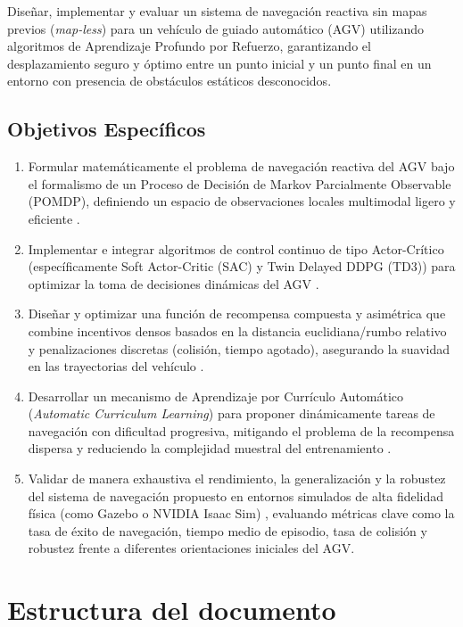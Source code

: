 Diseñar, implementar y evaluar un sistema de navegación reactiva sin mapas previos (\textit{map-less}) para un vehículo de guiado automático (AGV) utilizando algoritmos de Aprendizaje Profundo por Refuerzo, garantizando el desplazamiento seguro y óptimo entre un punto inicial y un punto final en un entorno con presencia de obstáculos estáticos desconocidos.

\subsection{Objetivos Específicos}

\begin{enumerate}
    \item Formular matemáticamente el problema de navegación reactiva del AGV bajo el formalismo de un Proceso de Decisión de Markov Parcialmente Observable (POMDP), definiendo un espacio de observaciones locales multimodal ligero y eficiente \cite{Xue2022, Guo2025}.
    \item Implementar e integrar algoritmos de control continuo de tipo Actor-Crítico (específicamente Soft Actor-Critic (SAC) y Twin Delayed DDPG (TD3)) para optimizar la toma de decisiones dinámicas del AGV \cite{Sivashangaran2023, Xue2022}.
    \item Diseñar y optimizar una función de recompensa compuesta y asimétrica que combine incentivos densos basados en la distancia euclidiana/rumbo relativo y penalizaciones discretas (colisión, tiempo agotado), asegurando la suavidad en las trayectorias del vehículo \cite{Guo2025, Ye2023}.
    \item Desarrollar un mecanismo de Aprendizaje por Currículo Automático (\textit{Automatic Curriculum Learning}) para proponer dinámicamente tareas de navegación con dificultad progresiva, mitigando el problema de la recompensa dispersa y reduciendo la complejidad muestral del entrenamiento \cite{Xue2022}.
    \item Validar de manera exhaustiva el rendimiento, la generalización y la robustez del sistema de navegación propuesto en entornos simulados de alta fidelidad física (como Gazebo o NVIDIA Isaac Sim) \cite{Sivashangaran2023, Xue2022, Guo2025}, evaluando métricas clave como la tasa de éxito de navegación, tiempo medio de episodio, tasa de colisión y robustez frente a diferentes orientaciones iniciales del AGV.
\end{enumerate}

\section{Estructura del documento}

